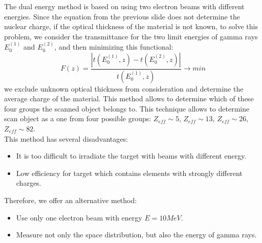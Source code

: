 \documentclass[a4paper]{panl}
\begin{document}
The dual energy method is based on using two electron beams with different energies. Since the equation from the previous slide does not determine the nuclear charge, if the optical thickness of the material is not known, to solve this problem, we consider the transmittance for the two limit energies of gamma rays $E^{(1)}_0$ and $E^{(2)}_0$, and then minimizing this functional:
\begin{equation}
F(z) = \frac{|t(E^{(1)}_0,z) - t(E^{(2)}_0,z)|}{t(E^{(1)}_0,z)} \to min
\end{equation}
we exclude unknown optical thickness from consideration and determine the average charge of the material. This method allows to determine which of these four groups the scanned object belongs to. This technique allows to determine scan object as a one from four possible groups: $Z_{eff} \sim 5$, $Z_{eff} \sim 13$, $Z_{eff} \sim 26$, $Z_{eff} \sim 82$.\\
This method has several disadvantages:
    \begin{itemize}
        \item It is too difficult to irradiate the target with beams with different energy.
        \item Low efficiency for target which contains elements with strongly different charges.
    \end{itemize}
Therefore, we offer an alternative method:
    \begin{itemize}
        \item Use only one electron beam with energy $E = 10 MeV$.
        \item Measure not only the space distribution, but also the energy of gamma rays.
    \end{itemize}
\end{document}
